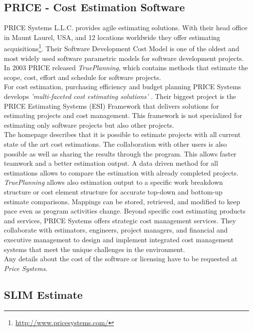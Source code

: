 \subsection{PRICE - Cost Estimation Software}

PRICE Systems L.L.C. provides agile estimating solutions. With their head office in Maunt Laurel, USA, and 12 locations worldwide they offer estimating acquisitions\footnote{\url{http://www.pricesystems.com/}}. Their Software Development Cost Model is one of the oldest and most widely used software parametric models for software development projects. In 2003 PRICE released \textit{TruePlanning}, which contains methods that estimate the scope, cost, effort and schedule for software projects.
\\
For cost estimation, purchasing efficiency and budget planning PRICE Systems develops \textit{'multi-faceted cost estimating solutions'} \cite{pricesystems}. Their biggest project is the PRICE Estimating Systems (ESI) Framework that delivers solutions for estimating projects and cost management. This framework is not specialized for estimating only software projects but also other projects.
\\
The homepage describes that it is possible to estimate projects with all current state of the art cost estimations. The collaboration with other users is also possible as well as sharing the results through the program. This allows faster teamwork and a better estimation output. A data driven method for all estimations allows to compare the estimation with already completed projects. \textit{TruePlanning} allows also estimation output to a specific work breakdown structure or cost element structure for accurate top-down and bottom-up estimate comparisons. Mappings can be stored, retrieved, and modified to keep pace even as program activities change. Beyond specific cost estimating products and services, PRICE Systems offers strategic cost management services. They collaborate with estimators, engineers, project managers, and financial and executive management to design and implement integrated cost management systems that meet the unique challenges in the environment.
\\
Any details about the cost of the software or licensing have to be requested at \textit{Price Systems}.

\subsection{SLIM Estimate}

